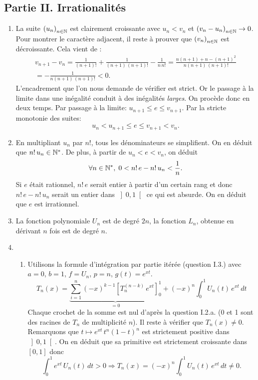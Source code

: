 \subsection*{Partie II. Irrationalités}
\begin{enumerate}
 \item La suite $\left( u_n \right)_{n \in \mathbb{N}}$ est clairement croissante avec $u_n < v_n$ et $\left( v_n - u_n \right)_{n \in \mathbb{N}}\rightarrow 0$. Pour montrer le caractère adjacent, il reste à prouver que $\left( v_n \right)_{n \in \mathbb{N}}$ est décroissante. Cela vient de :
\begin{multline*}
 v_{n+1} - v_n = \frac{1}{(n+1)!} + \frac{1}{(n+1)\, (n+1)!} - \frac{1}{n \, n!}
 = \frac{n(n+1) + n - (n+1)^2}{n(n+1)\, (n+1)!}\\
 = -\frac{1}{n(n+1)\, (n+1)!} < 0.
\end{multline*}
L'encadrement que l'on nous demande de vérifier est strict. Or le passage à la limite dans une inégalité conduit à des inégalités \emph{larges}. On procède donc en deux temps. Par passage à la limite: $u_{n+1} \leq e \leq v_{n+1}$. Par la stricte monotonie des suites:
\[
 u_n < u_{n+1} \leq e \leq v_{n+1} < v_n.
\]

 \item En multipliant $u_n$ par $n!$, tous les dénominateurs se simplifient. On en déduit que $n!\, u_n \in \mathbb{N}^*$. De plus, à partir de $u_n < e < v_n$, on déduit
 \[
  \forall n \in \mathbb{N}^*, \;
  0 < n!\,e - n!\, u_n < \frac{1}{n}. 
 \]
Si $e$ était rationnel, $n!\, e$ serait entier à partir d'un certain rang et donc $n!\,e - n!\, u_n$ serait un entier dans $\left] 0,1 \right[$ ce qui est absurde. On en déduit que $e$ est irrationnel. 
  
 \item La fonction polynomiale $U_n$ est de degré $2n$, la fonction $L_n$, obtenue en dérivant $n$ fois est de degré $n$.
 
 \item
  \begin{enumerate}
    \item Utilisons la formule d'intégration par partie itérée (question I.3.) avec $a=0$, $b=1$, $f = U_n$, $p=n$, $g(t) = e^{xt}$.
\[
 T_n(x) = \underset{= 0 }{\underbrace{\sum_{i=1}^{n}(-x)^{k-1}\left[ T_n^{(n-k)}\,e^{xt}\right]_0^{1}}} 
  + (-x)^n\int_0^1U_n(t)\,e^{xt}\,dt 
\]
Chaque crochet de la somme est nul d'après la question I.2.a. (0 et 1 sont des racines de $T_n$ de multiplicité $n$).\newline
Il reste à vérifier que $T_n(x) \neq 0$. Remarquons que $t\mapsto e^{xt}\, t^n(1-t)^n$ est strictement positive dans $\left] 0,1 \right[$. On en déduit que sa primitive est strictement croissante dans $\left[ 0,1\right]$ donc 
\[
 \int_0^1 e^{xt}\,U_n(t)\,dt > 0 \Rightarrow  T_n(x) = (-x)^n\int_0^1U_n(t)\,e^{xt}\,dt \neq 0.
\]


\end{enumerate}
\end{enumerate}
